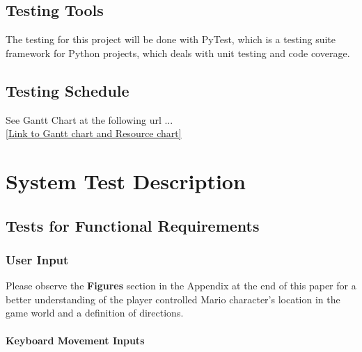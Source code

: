\documentclass[12pt, titlepage]{article}
\begin{document}
\subsection{Testing Tools}
The testing for this project will be done with PyTest, which is a testing suite framework for
Python projects, which deals with unit testing and code coverage.



\subsection{Testing Schedule}
See Gantt Chart at the following url ...\\
\href{https://gitlab.cas.mcmaster.ca/jandricd/super-refactored-mario-bros/tree/master/ProjectSchedule}{[Link to Gantt chart and Resource chart]}



\section{System Test Description}
	
\subsection{Tests for Functional Requirements}

\subsubsection{User Input}

Please observe the \textbf{Figures} section in the Appendix at the end of this paper for a better understanding of the player controlled Mario character's location in the game world and a definition of directions.
		
\paragraph{Keyboard Movement Inputs}
\end{document}
